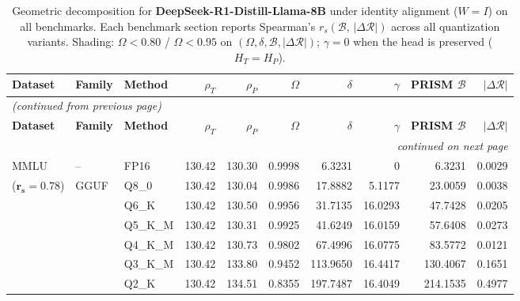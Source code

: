 \begingroup
\small
\setlength{\tabcolsep}{4pt}
\renewcommand{\arraystretch}{1.05}
\setlength{\LTcapwidth}{\textwidth}
\begin{longtable}{ll l rrrrrrr}
\caption{Geometric decomposition for \textbf{DeepSeek-R1-Distill-Llama-8B} under identity alignment ($W{=}I$) on all benchmarks. Each benchmark section reports Spearman's $r_s(\mathcal{B},\,|\Delta\mathcal{R}|)$ across all quantization variants. Shading: \colorbox{red!35}{$\Omega{<}0.80$} / \colorbox{red!18}{$\Omega{<}0.95$} on $(\Omega,\delta,\mathcal{B},|\Delta\mathcal{R}|)$; \colorbox{cyan!12}{$\gamma{=}0$} when the head is preserved ($H_T{=}H_P$).}\label{tab:deepseek_decomposition_all_bound}\\
\toprule
\textbf{Dataset} & \textbf{Family} & \textbf{Method} & \textbf{$\rho_T$} & \textbf{$\rho_P$} & \textbf{$\Omega$} & \textbf{$\delta$} & \textbf{$\gamma$} & \textbf{PRISM $\mathcal{B}$} & \textbf{$|\Delta\mathcal{R}|$} \\
\midrule
\endfirsthead
\multicolumn{10}{l}{\small\itshape (continued from previous page)}\\
\toprule
\textbf{Dataset} & \textbf{Family} & \textbf{Method} & \textbf{$\rho_T$} & \textbf{$\rho_P$} & \textbf{$\Omega$} & \textbf{$\delta$} & \textbf{$\gamma$} & \textbf{PRISM $\mathcal{B}$} & \textbf{$|\Delta\mathcal{R}|$} \\
\midrule
\endhead
\midrule
\multicolumn{10}{r}{\small\itshape continued on next page}\\
\endfoot
\bottomrule
\endlastfoot
MMLU & -- & FP16 & 130.42 & 130.30 & 0.9998 & 6.3231 & \cellcolor{cyan!12} $0$ & 6.3231 & 0.0029 \\
{\small ($\mathbf{r_s{=}0.78}$)} & GGUF & Q8\_0 & 130.42 & 130.04 & 0.9986 & 17.8882 & 5.1177 & 23.0059 & 0.0038 \\
 &  & Q6\_K & 130.42 & 130.50 & 0.9956 & 31.7135 & 16.0293 & 47.7428 & 0.0205 \\
 &  & Q5\_K\_M & 130.42 & 130.31 & 0.9925 & 41.6249 & 16.0159 & 57.6408 & 0.0273 \\
 &  & Q4\_K\_M & 130.42 & 130.73 & 0.9802 & 67.4996 & 16.0775 & 83.5772 & 0.0121 \\
 &  & Q3\_K\_M & 130.42 & 133.80 & \cellcolor{red!18} 0.9452 & \cellcolor{red!18} 113.9650 & 16.4417 & \cellcolor{red!18} 130.4067 & \cellcolor{red!18} 0.1651 \\
 &  & Q2\_K & 130.42 & 134.51 & \cellcolor{red!18} 0.8355 & \cellcolor{red!18} 197.7487 & 16.4049 & \cellcolor{red!18} 214.1535 & \cellcolor{red!18} 0.4977 \\

\end{longtable}
